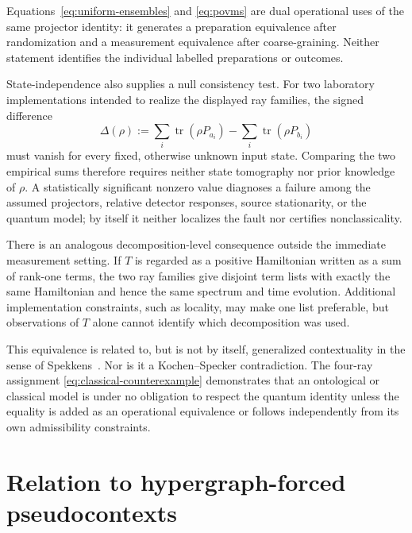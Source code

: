 \documentclass[
  twocolumn,
  aps,
  pra,
  floatfix,
  amsmath,amssymb,
  longbibliography
]{revtex4-2}
\theoremstyle{definition}
\theoremstyle{remark}
\newcommand{\Tr}{\operatorname{tr}}
\newcommand{\1}{\mathbf 1}
\begin{document}
Equations~\eqref{eq:uniform-ensembles} and \eqref{eq:povms} are dual
operational uses of the same projector identity: it generates a preparation
equivalence after randomization and a measurement equivalence after
coarse-graining.  Neither statement identifies the individual labelled
preparations or outcomes.

State-independence also supplies a null consistency test.  For two laboratory
implementations intended to realize the displayed ray families, the signed
difference
\begin{equation}
 \Delta(\rho):=
 \sum_i\Tr(\rho P_{a_i})-\sum_i\Tr(\rho P_{b_i})
 \label{eq:null-test}
\end{equation}
must vanish for every fixed, otherwise unknown input state.  Comparing the
two empirical sums therefore requires neither state tomography nor prior
knowledge of $\rho$.  A statistically significant nonzero value diagnoses a
failure among the assumed projectors, relative detector responses, source
stationarity, or the quantum model; by itself it neither localizes the fault
nor certifies nonclassicality.

There is an analogous decomposition-level consequence outside the immediate
measurement setting.  If $T$ is regarded as a positive Hamiltonian written
as a sum of rank-one terms, the two ray families give disjoint term lists
with exactly the same Hamiltonian and hence the same spectrum and time
evolution.  Additional implementation constraints, such as locality, may
make one list preferable, but observations of $T$ alone cannot identify
which decomposition was used.

This equivalence is related to, but is not by itself, generalized
contextuality in the sense of Spekkens~\cite{Spekkens-04}.  Nor is it a
Kochen--Specker contradiction.  The four-ray assignment
\eqref{eq:classical-counterexample} demonstrates that an ontological or
classical model is under no obligation to respect the quantum identity unless
the equality is added as an operational equivalence or follows independently
from its own admissibility constraints.

\section{Relation to hypergraph-forced pseudocontexts}
\label{sec:relation}
\end{document}
